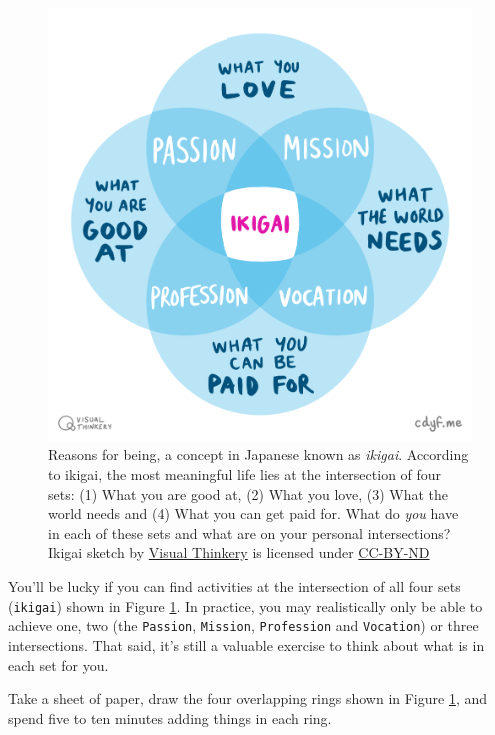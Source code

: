 \documentclass[
]{book}
\begin{document}
\begin{figure}

{\centering \includegraphics[width=1\linewidth]{images/IKIGAI-visual-thinkery} 

}

\caption{Reasons for being, a concept in Japanese known as \emph{ikigai}. According to ikigai, the most meaningful life lies at the intersection of four sets: (1) What you are good at, (2) What you love, (3) What the world needs and (4) What you can get paid for. What do \emph{you} have in each of these sets and what are on your personal intersections? Ikigai sketch by \href{https://visualthinkery.com}{Visual Thinkery} is licensed under \href{https://creativecommons.org/licenses/by-nd/4.0/}{CC-BY-ND}}\label{fig:iki-fig}
\end{figure}



You'll be lucky if you can find activities at the intersection of all four sets (\texttt{ikigai}) shown in Figure \ref{fig:iki-fig}. In practice, you may realistically only be able to achieve one, two (the \texttt{Passion}, \texttt{Mission}, \texttt{Profession} and \texttt{Vocation}) or three intersections. That said, it's still a valuable exercise to think about what is in each set for you.

Take a sheet of paper, draw the four overlapping rings shown in Figure \ref{fig:iki-fig}, and spend five to ten minutes adding things in each ring.
\end{document}
